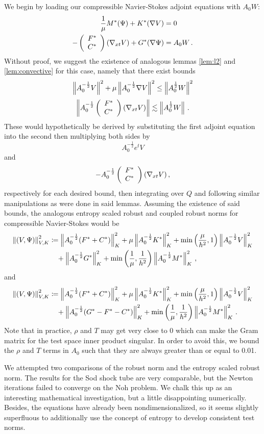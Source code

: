 \documentclass[Dissertation.tex]{subfiles}
\begin{document}
We begin by loading our compressible Navier-Stokes adjoint equations with $A_0W$:
\begin{align*}
\frac{1}{\mu}M^*(\Psi)+K^*(\nabla V)&=0
\\
-\left( \begin{array}{c} F^*\\ C^*\\ \end{array} \right)(\nabla_{xt} V)+G^*(\nabla\Psi)&=A_0W\,.
\end{align*}
Without proof, we suggest the existence of analogous lemmas \ref{lem:l2} and \ref{lem:convective}  
for this case, namely that there exist bounds
\begin{equation}
\left\| A_0^{-\frac{1}{2}}V \right\|^2+\mu\left\| A_0^{-\frac{1}{2}}\nabla V \right\|^2\leq\left\| A_0^\frac{1}{2}W \right\|^2
\end{equation}
\begin{equation}
\left\| A_0^{-\frac{1}{2}}\left( \begin{array}{c} F^*\\ C^*\\ \end{array} \right)(\nabla_{xt} V) \right\|\lesssim\left\| A_0^\frac{1}{2}W \right\|\,.
\end{equation}
These would hypothetically be derived by substituting the first adjoint equation into 
the second then multiplying both sides by
\[
A_0^{-\frac{1}{2}}e^tV
\]
and
\[
-A_0^{-\frac{1}{2}}\left( \begin{array}{c} F^*\\ C^*\\ \end{array} \right)(\nabla_{xt} V)\,,
\]
respectively for each desired bound, then integrating over $Q$ and following similar manipulations as were done in said lemmas.
Assuming the existence of said bounds, the analogous entropy scaled robust and coupled robust norms
for compressible Navier-Stokes would be
\begin{align*}
\left\| \left( V,\Psi \right) \right\|_{V,K}^2 &\coloneqq
\left\| A_0^{-\frac{1}{2}}(F^*+C^*) \right\|_K^2
+ \mu\left\| A_0^{-\frac{1}{2}}K^* \right\|_K^2
+ \min\left( \frac{\mu}{h^2},1 \right)\left\| A_0^{-\frac{1}{2}}V \right\|^2_K
\\\nonumber&\quad
+ \left\| A_0^{-\frac{1}{2}}G^* \right\|_K^2
+ \min\left( \frac{1}{\mu},\frac{1}{h^2} \right)\left\| A_0^{-\frac{1}{2}}M^* \right\|_K^2\,,
\end{align*}
and
\begin{align*}
\left\| \left( V,\Psi \right) \right\|_{V,K}^2 &\coloneqq
\left\| A_0^{-\frac{1}{2}}(F^*+C^*) \right\|_K^2
+ \mu\left\| A_0^{-\frac{1}{2}}K^* \right\|_K^2
+ \min\left( \frac{\mu}{h^2},1 \right)\left\| A_0^{-\frac{1}{2}}V \right\|^2_K
\\\nonumber&\quad
+ \left\| A_0^{-\frac{1}{2}}(G^*-F^*-C^*) \right\|_K^2
+ \min\left( \frac{1}{\mu},\frac{1}{h^2} \right)\left\| A_0^{-\frac{1}{2}}M^* \right\|_K^2\,.
\end{align*}
Note that in practice, $\rho$ and $T$ may get very close to 0 which can make the
Gram matrix for the test space inner product singular. In order to avoid this,
we bound the $\rho$ and $T$ terms in $A_0$ such that they are always greater than or equal
to 0.01.

We attempted two comparisons of the robust norm and the entropy scaled robust norm. 
The results for the Sod shock tube are very comparable, but the Newton iterations
failed to converge on the Noh problem.
We chalk this up as an interesting mathematical investigation, but a little disappointing numerically.
Besides, the equations have already been nondimensionalized, so it seems slightly superfluous
to additionally use the concept of entropy to develop consistent test norms.
\end{document}
